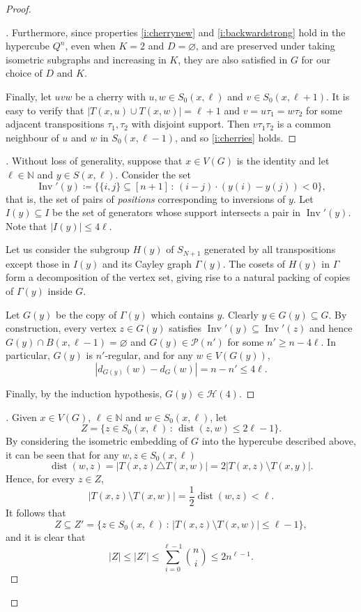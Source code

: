 \documentclass[reqno,a4paper,11pt]{amsart}
\newcounter{prop}
\theoremstyle{definition}
\newcommand{\dist}{\operatorname{dist}}
\newcommand{\Inv}{\operatorname{Inv}}
\renewcommand{\leq}{\leqslant}
\renewcommand{\geq}{\geqslant}
\renewcommand{\emptyset}{\varnothing}
\begin{document}
\begin{proof}
\begin{proof}[]
    Furthermore, since properties \ref{i:cherrynew} and \ref{i:backwardstrong} hold in the hypercube $Q^n$, even when $K=2$ and $D=\emptyset$, and are preserved under taking isometric subgraphs and increasing in $K$, they are also satisfied in $G$ for our choice of $D$ and $K$.

    Finally, let $uvw$ be a cherry with $u, w \in S_0(x, \ell)$ and $v \in S_0(x, \ell+1)$.
    It is easy to verify that $|T(x, u) \cup T(x, w)|=\ell+1$ and $v= u \tau_1 = w \tau_2$ for some adjacent transpositions $\tau_1, \tau_2$ with disjoint support.
    Then $v\tau_1\tau_2$ is a common neighbour of $u$ and $w$ in $S_0(x, \ell-1)$, and so \ref{i:cherries} holds.
\end{proof}

\begin{proof}[]\let\qed\relax
  Without loss of generality, suppose that $x \in V(G)$ is the identity and let $\ell \in \mathbb{N}$ and $y \in S(x,\ell)$.
  Consider the set
  \[
    \Inv'(y) \coloneqq \{\{i, j\} \subseteq [n+1] \,:\, (i-j)\cdot(y(i)-y(j)) < 0\},
  \]
  that is, the set of pairs of \emph{positions} corresponding to inversions of $y$.
  Let $I(y) \subseteq I$ be the set of generators whose support intersects a pair in $\Inv'(y)$.
  Note that $|I(y)| \leq 4 \ell$.

  Let us consider the subgroup $H(y)$ of $S_{N+1}$ generated by all transpositions except those in $I(y)$ and its Cayley graph $\Gamma(y)$.
  The cosets of $H(y)$ in $\Gamma$ form a decomposition of the vertex set, giving rise to a natural packing of copies of $\Gamma(y)$ inside $G$.

  Let $G(y)$ be the copy of $\Gamma(y)$ which contains $y$.
  Clearly $y \in G(y) \subseteq G$.
  By construction, every vertex $z \in G(y)$ satisfies $\Inv'(y) \subseteq \Inv'(z)$ and hence $G(y) \cap B(x, \ell-1)=\emptyset$ and $G(y) \in \mathcal{P}(n')$ for some $n' \geq n-4\ell$.
  In particular, $G(y)$ is $n'$-regular, and for any $w \in V(G(y))$,
  \[
    |d_{G(y)}(w) - d_G(w)|  = n-n' \leq 4\ell.
  \]

  Finally, by the induction hypothesis, $G(y) \in \mathcal{H}(4)$.
\end{proof}

\begin{proof}[]\let\qed\relax
  Given $x \in V(G)$, $\ell \in \mathbb{N}$ and $w \in S_0(x,\ell)$, let
  \[
    Z = \{ z \in S_0(x,\ell) \,:\, \dist(z,w) \leq 2\ell-1\}.
  \]
  By considering the isometric embedding of $G$ into the hypercube described above, it can be seen that for any $w,z \in S_0(x,\ell)$
  \[
    \dist(w, z) = |T(x, z) \triangle T(x,w)|=2|T(x,z) \setminus T(x,y)|.
  \]
  Hence, for every $z \in Z$,
  \[
    |T(x,z) \setminus T(x,w)| = \frac{1}{2} \dist(w, z) < \ell.
  \]
  It follows that
  \[
    Z \subseteq Z' = \{ z \in S_0(x, \ell) \,:\, |T(x,z) \setminus T(x,w)| \leq \ell-1\},
  \]
  and it is clear that
  \[
    |Z| \leq |Z'| \leq \sum_{i=0}^{\ell-1} \binom{n}{i} \leq 2n^{\ell-1}.
  \]
  \end{proof}


\end{proof}
\end{document}
